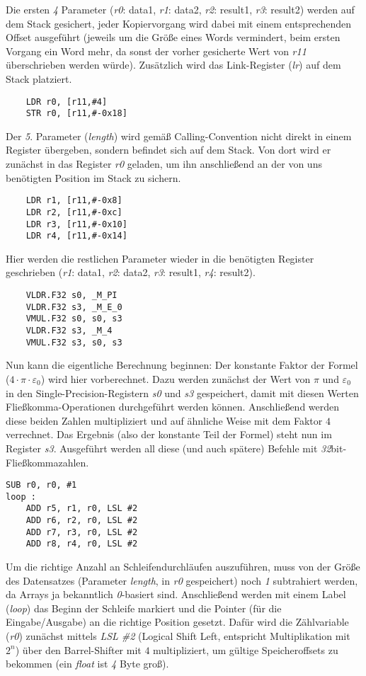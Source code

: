\documentclass[11pt]{scrartcl}
\begin{document}
Die ersten \emph{4} Parameter (\emph{r0}: data1, \emph{r1}: data2, \emph{r2}: result1, \emph{r3}: result2) werden auf dem Stack gesichert, jeder Kopiervorgang wird dabei mit einem entsprechenden Offset ausgeführt (jeweils um die Größe eines Words vermindert, beim ersten Vorgang ein Word mehr, da sonst der vorher gesicherte Wert von \emph{r11} überschrieben werden würde). Zusätzlich wird das Link-Register (\emph{lr}) auf dem Stack platziert.
\begin{verbatim}
	LDR r0, [r11,#4]
	STR r0, [r11,#-0x18]
\end{verbatim}
Der \emph{5}. Parameter (\emph{length}) wird gemäß Calling-Convention nicht direkt in einem Register übergeben, sondern befindet sich auf dem Stack. Von dort wird er zunächst in das Register \emph{r0} geladen, um ihn anschließend an der von uns benötigten Position im Stack zu sichern.
\begin{verbatim}
	LDR r1, [r11,#-0x8]
	LDR r2, [r11,#-0xc]
	LDR r3, [r11,#-0x10]
	LDR r4, [r11,#-0x14]
\end{verbatim}
Hier werden die restlichen Parameter wieder in die benötigten Register geschrieben (\emph{r1}: data1, \emph{r2}: data2, \emph{r3}: result1, \emph{r4}: result2).
\begin{verbatim}
	VLDR.F32 s0, _M_PI
	VLDR.F32 s3, _M_E_0
	VMUL.F32 s0, s0, s3
	VLDR.F32 s3, _M_4
	VMUL.F32 s3, s0, s3
\end{verbatim}
Nun kann die eigentliche Berechnung beginnen: Der konstante Faktor der Formel ($4 \cdot \pi \cdot \varepsilon_{0}$) wird hier vorberechnet. Dazu werden zunächst der Wert von $\pi$ und $\varepsilon_{0}$ in den Single-Precision-Registern \emph{s0} und \emph{s3} gespeichert, damit mit diesen Werten Fließkomma-Operationen durchgeführt werden können. Anschließend werden diese beiden Zahlen multipliziert und auf ähnliche Weise mit dem Faktor $4$ verrechnet. Das Ergebnis (also der konstante Teil der Formel) steht nun im Register \emph{s3}. Ausgeführt werden all diese (und auch spätere) Befehle mit \emph{32}bit-Fließkommazahlen.
\begin{verbatim}
SUB r0, r0, #1
loop :
	ADD r5, r1, r0, LSL #2
	ADD r6, r2, r0, LSL #2
	ADD r7, r3, r0, LSL #2
	ADD r8, r4, r0, LSL #2
\end{verbatim}
Um die richtige Anzahl an Schleifendurchläufen auszuführen, muss von der Größe des Datensatzes (Parameter \emph{length}, in \emph{r0} gespeichert) noch \emph{1} subtrahiert werden, da Arrays ja bekanntlich \emph{0}-basiert sind. Anschließend werden mit einem Label (\emph{loop}) das Beginn der Schleife markiert und die Pointer (für die Eingabe/Ausgabe) an die richtige Position gesetzt. Dafür wird die Zählvariable (\emph{r0}) zunächst mittels \emph{LSL \#2} (Logical Shift Left, entspricht Multiplikation mit $2^{n}$) über den Barrel-Shifter mit $4$ multipliziert, um gültige Speicheroffsets zu bekommen (ein \emph{float} ist \emph{4} Byte groß).
\end{document}
